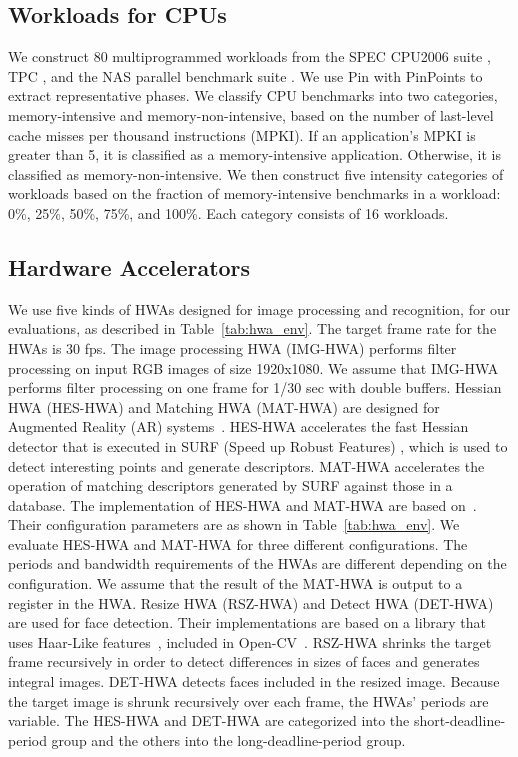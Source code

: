 \documentclass[10pt,letterpaper]{article}
\newcommand{\TMP}[1]{#1}
\begin{document}
\subsection{Workloads for CPUs} 
We construct 80 multiprogrammed workloads from
the SPEC CPU2006 suite \cite{spec2006}, TPC \cite{tpc}, and the NAS parallel
benchmark suite \cite{nas}. We use Pin \cite{pin} with PinPoints \cite{pinpoint}
to extract representative phases. We classify CPU benchmarks into two
categories, memory-intensive and memory-non-intensive, based on the number of
last-level cache misses per thousand instructions (MPKI). If an application's
MPKI is greater than 5, it is classified as a memory-intensive application.
Otherwise, it is classified as memory-non-intensive. We then construct five
intensity categories of workloads based on the fraction of memory-intensive
benchmarks in a workload: 0\%, 25\%, 50\%, 75\%, and 100\%. Each category
consists of 16 workloads.



\subsection{Hardware Accelerators}\label{sec:HWAs}
We use five kinds of HWAs designed for image processing and recognition, for our
evaluations, as described in Table~\ref{tab:hwa_env}. The target frame rate for
the HWAs is 30 fps.  The image processing HWA (IMG-HWA) performs filter
processing on input RGB images of size 1920x1080. We assume that IMG-HWA
performs filter processing on one frame for 1/30 sec with double buffers.
Hessian HWA (HES-HWA) and Matching HWA (MAT-HWA) are designed for Augmented
Reality (AR) systems~\cite{mra}. HES-HWA accelerates the fast Hessian detector
that is executed in SURF (Speed up Robust Features) \cite{surf}, which is used
to detect interesting points and generate descriptors. MAT-HWA accelerates the
operation of matching descriptors generated by SURF against those in a database.
The implementation of HES-HWA and MAT-HWA are based on~\cite{mra}. Their
configuration parameters are as shown in Table~\ref{tab:hwa_env}. 
We evaluate HES-HWA and MAT-HWA for three different
configurations. The periods and bandwidth requirements of the HWAs are different depending on
the configuration.
\TMP{We assume that
the result of the MAT-HWA is output to a register in the HWA.}
Resize HWA (RSZ-HWA) and Detect HWA (DET-HWA) are used for face detection. Their
implementations are based on a library that uses Haar-Like
features~\cite{haarlike}, included in Open-CV~\cite{opencv}. RSZ-HWA shrinks the
target frame recursively in order to detect differences in sizes of faces and
generates integral images. DET-HWA detects faces included in the resized image.
Because the target image is shrunk recursively over each frame, the HWAs'
periods are variable. 
The HES-HWA and DET-HWA are categorized into
the short-deadline-period group and the others into the long-deadline-period
group.
\end{document}
